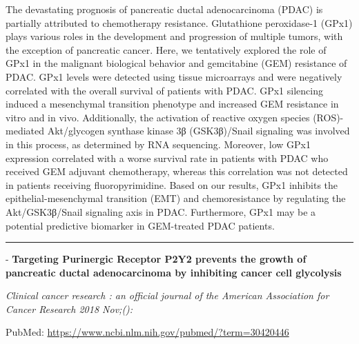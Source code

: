 \documentclass[]{article}
\begin{document}
The devastating prognosis of pancreatic ductal adenocarcinoma (PDAC) is
partially attributed to chemotherapy resistance. Glutathione
peroxidase-1 (GPx1) plays various roles in the development and
progression of multiple tumors, with the exception of pancreatic cancer.
Here, we tentatively explored the role of GPx1 in the malignant
biological behavior and gemcitabine (GEM) resistance of PDAC. GPx1
levels were detected using tissue microarrays and were negatively
correlated with the overall survival of patients with PDAC. GPx1
silencing induced a mesenchymal transition phenotype and increased GEM
resistance in vitro and in vivo. Additionally, the activation of
reactive oxygen species (ROS)-mediated Akt/glycogen synthase kinase 3β
(GSK3β)/Snail signaling was involved in this process, as determined by
RNA sequencing. Moreover, low GPx1 expression correlated with a worse
survival rate in patients with PDAC who received GEM adjuvant
chemotherapy, whereas this correlation was not detected in patients
receiving fluoropyrimidine. Based on our results, GPx1 inhibits the
epithelial-mesenchymal transition (EMT) and chemoresistance by
regulating the Akt/GSK3β/Snail signaling axis in PDAC. Furthermore, GPx1
may be a potential predictive biomarker in GEM-treated PDAC patients.

{}

{}

\begin{center}\rule{0.5\linewidth}{\linethickness}\end{center}

 - \textbf{Targeting Purinergic Receptor P2Y2 prevents the growth of
pancreatic ductal adenocarcinoma by inhibiting cancer cell glycolysis}

\emph{Clinical cancer research : an official journal of the American
Association for Cancer Research 2018 Nov;():}

PubMed: \url{https://www.ncbi.nlm.nih.gov/pubmed/?term=30420446}
\end{document}
